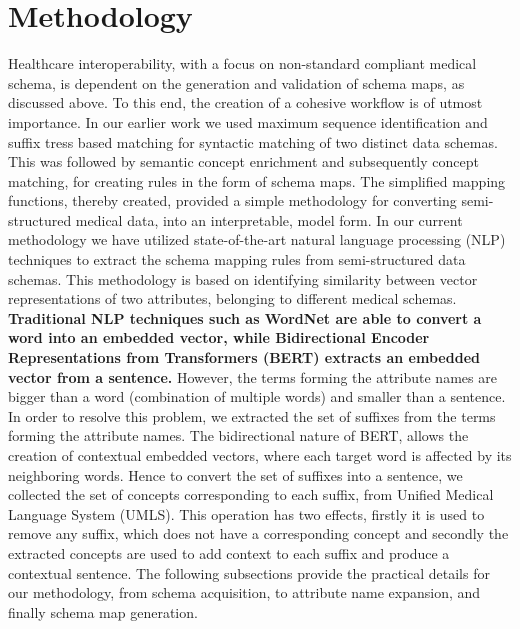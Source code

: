 
\section*{Methodology}
\label{methodology}
Healthcare interoperability, with a focus on non-standard compliant medical schema, is dependent on the generation and validation of schema maps, as discussed above. To this end, the creation of a cohesive workflow is of utmost importance. In our earlier work \cite{Satti2020} we used maximum sequence identification and suffix tress based matching for syntactic matching of two distinct data schemas. This was followed by semantic concept enrichment and subsequently concept matching, for creating rules in the form of schema maps. The simplified mapping functions, thereby created, provided a simple methodology for converting semi-structured medical data, into an interpretable, model form.
In our current methodology we have utilized state-of-the-art natural language processing (NLP) techniques to extract the schema mapping rules from semi-structured data schemas. This methodology is based on identifying similarity between vector representations of two attributes, belonging to different medical schemas. 
\textbf{Traditional NLP techniques such as WordNet are able to convert a word into an embedded vector, while Bidirectional Encoder Representations from Transformers (BERT) extracts an embedded vector from a sentence.} However, the terms forming the attribute names are bigger than a word (combination of multiple words) and smaller than a sentence. In order to resolve this problem, we extracted the set of suffixes from the terms forming the attribute names. The bidirectional nature of BERT, allows the creation of contextual embedded vectors, where each target word is affected by its neighboring words. Hence to convert the set of suffixes into a sentence, we collected the set of concepts corresponding to each suffix, from Unified Medical Language System (UMLS). This operation has two effects, firstly it is used to remove any suffix, which does not have a corresponding concept and secondly the extracted concepts are used to add context to each suffix and produce a contextual sentence. 
The following subsections provide the practical details for our methodology, from schema acquisition, to attribute name expansion, and finally schema map generation.

